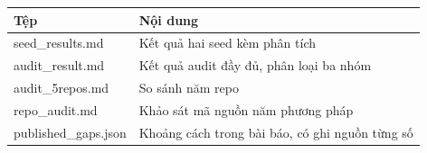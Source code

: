 \documentclass[11pt,a4paper]{article}
\newcommand{\code}[1]{{\ttfamily\small\color{codetext}#1}}
\begin{document}
\begin{center}\small
\begin{tabular}{@{}ll@{}}
\toprule
\textbf{Tệp} & \textbf{Nội dung}\\
\midrule
\code{seed\_results.md} & Kết quả hai seed kèm phân tích\\
\code{audit\_result.md} & Kết quả audit đầy đủ, phân loại ba nhóm\\
\code{audit\_5repos.md} & So sánh năm repo\\
\code{repo\_audit.md} & Khảo sát mã nguồn năm phương pháp\\
\code{published\_gaps.json} & Khoảng cách trong bài báo, có ghi nguồn từng số\\
\bottomrule
\end{tabular}
\end{center}
\end{document}
